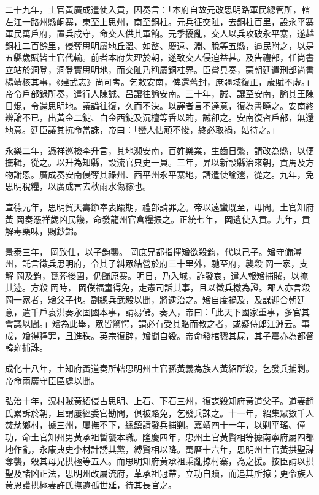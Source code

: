 \begin{pinyinscope}
二十九年，土官黃廣成遣使入貢，因奏言：「本府自故元改思明路軍民總管所，轄左江一路州縣峒寨，東至上思州，南至銅柱。元兵征交阯，去銅柱百里，設永平寨軍民萬戶府，置兵戍守，命交人供其軍餉。元季擾亂，交人以兵攻破永平寨，遂越銅柱二百餘里，侵奪思明屬地丘溫、如嶅、慶遠、淵、脫等五縣，逼民附之，以是五縣歲賦皆土官代輸。前者本府失理於朝，遂致交人侵迫益甚。及告禮部，任尚書立站於洞登，洞登實思明地，而交阯乃稱屬銅柱界。臣嘗具奏，蒙朝廷遣刑部尚書楊靖核其事，《建武志》尚可考。乞敕安南，俾還舊封，庶疆域復正，歲賦不虛。」帝令戶部錄所奏，遣行人陳誠、呂讓往諭安南。三十年，誠、讓至安南，諭其王陳日焜，令還思明地。議論往復，久而不決。以譯者言不達意，復為書曉之。安南終辨論不已，出黃金二錠、白金西錠及沉檀等香以賄，誠卻之。安南復咨戶部，無還地意。廷臣議其抗命當誅，帝曰：「蠻人怙頑不悛，終必取禍，姑待之。」

永樂二年，憑祥巡檢李升言，其地瀕安南，百姓樂業，生齒日繁，請改為縣，以便撫輯，從之。以升為知縣，設流官典史一員。三年，昇以新設縣治來朝，貢馬及方物謝恩。廣成奏安南侵奪其祿州、西平州永平寨地，請遣使諭還，從之。九年，免思明稅糧，以廣成言去秋雨水傷稼也。

宣德元年，思明賀天壽節奉表踰期，禮部請罪之。帝以遠蠻既至，毋問。土官知府黃岡奏憑祥歲凶民饑，命發龍州官倉糧振之。正統七年，岡遺使入貢。九年，貢解毒藥味，賜鈔錦。

景泰三年，岡致仕，以子鈞襲。岡庶兄都指揮矰欲殺鈞，代以己子。矰守備潯州，託言徵兵思明府，令其子糾眾結營於府三十里外，馳至府，襲殺岡一家，支解岡及鈞，甕葬後圃，仍歸原寨。明日，乃入城，詐發哀，遣人報矰捕賊，以掩其迹。方殺岡時，岡僕福童得免，走憲司訴其事，且以徵兵檄為證。郡人亦言殺岡一家者，矰父子也。副總兵武毅以聞，將逮治之。矰自度禍及，及謀迎合朝廷意，遣千戶袁洪奏永固國本事，請易儲。奏入，帝曰：「此天下國家重事，多官其會議以聞。」矰為此舉，眾皆驚愕，謂必有受其賂而教之者，或疑侍郎江淵云。事成，矰得釋罪，且進秩。英宗復辟，矰聞自殺。帝命發棺戮其屍，其子震亦為都督韓雍捕誅。

成化十八年，土知府黃道奏所轄思明州土官孫黃義為族人黃紹所殺，乞發兵捕剿。帝命兩廣守臣區處以聞。

弘治十年，況村賊黃紹侵占思明、上石、下石三州，復謀殺知府黃道父子。道妻趙氏累訴於朝，且謂屢經委官勘問，俱被賂免，乞發兵誅之。十一年，紹集眾數千人焚劫鄉村，據三州，屢撫不下，總鎮請發兵捕剿。嘉靖四十一年，以剿平瑤、僮功，命土官知州男黃承祖暫襲本職。隆慶四年，忠州土官黃賢相等據南寧府屬四都地作亂，永康典史李材計誘其黨，縛賢相以降。萬曆十六年，思明州土官黃拱聖謀奪襲，殺其母兄拱極等五人。而思明知府黃承祖乘亂掠村寨，為之援。按臣請以拱聖及諸凶正法，思明州改屬流府，革承祖冠帶，立功自贖，而追其所掠；更令族人黃恩護拱極妻許氏撫遺孤世延，待其長官之。


\end{pinyinscope}
